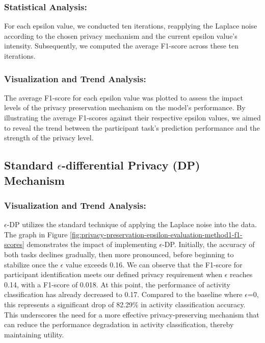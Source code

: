 \documentclass{l4proj}
\begin{document}
\subsubsection{Statistical Analysis:}
For each epsilon value, we conducted ten iterations, reapplying the Laplace noise according to the chosen privacy mechanism and the current epsilon value's intensity. Subsequently, we computed the average F1-score across these ten iterations.

\subsubsection{Visualization and Trend Analysis:}
The average F1-score for each epsilon value was plotted to assess the impact levels of the privacy preservation mechanism on the model's performance. By illustrating the average F1-scores against their respective epsilon values, we aimed to reveal the trend between the participant task's prediction performance and the strength of the privacy level.

\subsection{Standard $\epsilon$-differential Privacy (DP) Mechanism}
\subsubsection{Visualization and Trend Analysis:}
$\epsilon$-DP utilizes the standard technique of applying the Laplace noise into the data. The graph in Figure \ref{fig:privacy-preservation-epsilon-evaluation-method1-f1-scores} demonstrates the impact of implementing $\epsilon$-DP. Initially, the accuracy of both tasks declines gradually, then more pronounced, before beginning to stabilize once the $\epsilon$ value exceeds 0.16. We can observe that the F1-score for participant identification meets our defined privacy requirement when $\epsilon$ reaches 0.14, with a F1-score of 0.018. At this point, the performance of activity classification has already decreased to 0.17. Compared to the baseline where $\epsilon$=0, this represents a significant drop of 82.29\% in activity classification accuracy. This underscores the need for a more effective privacy-preserving mechanism that can reduce the performance degradation in activity classification, thereby maintaining utility.
\end{document}
